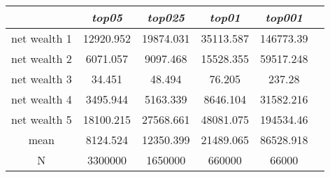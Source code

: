 \begin{tabular}{cccccc}
\hline \textit{}&      \textit{top05}& \textit{top025}&        \textit{top01}& \textit{top001}\\ \hline
net wealth 1&12920.952&19874.031&35113.587&146773.39\\
net wealth 2&6071.057&9097.468&15528.355&59517.248\\
net wealth 3&34.451&48.494&76.205&237.28\\
net wealth 4&3495.944&5163.339&8646.104&31582.216\\
net wealth 5&18100.215&27568.661&48081.075&194534.46\\
mean&8124.524&12350.399&21489.065&86528.918\\
N&3300000&1650000&660000&66000\\
\hline \end{tabular}
